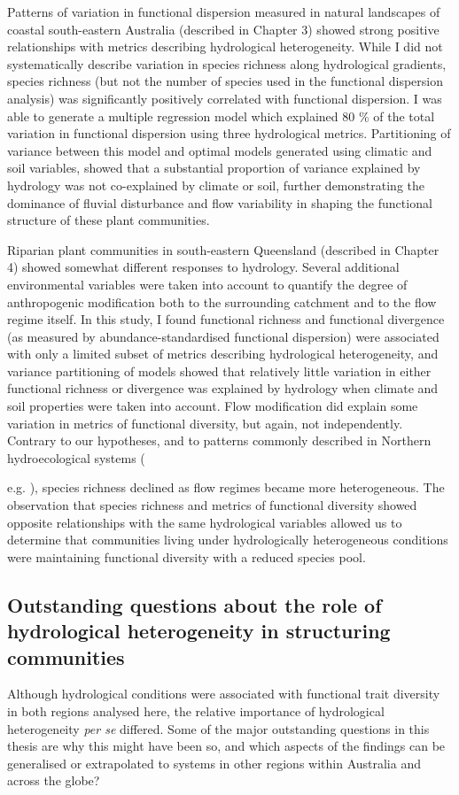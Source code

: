 \documentclass[openright,12pt,a4paper]{memoir}
\begin{document}
{Patterns of variation in functional dispersion measured in natural landscapes of coastal south-eastern Australia (described in Chapter 3) showed strong positive relationships with metrics describing hydrological heterogeneity. While I did not systematically describe variation in species richness along hydrological gradients, species richness (but not the number of species used in the functional dispersion analysis) was significantly positively correlated with functional dispersion. I was able to generate a multiple regression model which explained 80 \% of the total variation in functional dispersion using three hydrological metrics. Partitioning of variance between this model and optimal models generated using climatic and soil variables, showed that a substantial proportion of variance explained by hydrology was not co-explained by climate or soil, further demonstrating the dominance of fluvial disturbance and flow variability in shaping the functional structure of these plant communities.

Riparian plant communities in south-eastern Queensland (described in Chapter 4) showed somewhat different responses to hydrology. Several additional environmental variables were taken into account to quantify the degree of anthropogenic modification both to the surrounding catchment and to the flow regime itself. In this study, I found functional richness and functional divergence (as measured by abundance-standardised functional dispersion) were associated with only a limited subset of metrics describing hydrological heterogeneity, and variance partitioning of models showed that relatively little variation in either functional richness or divergence was explained by hydrology when climate and soil properties were taken into account. Flow modification did explain some variation in metrics of functional diversity, but again, not independently. Contrary to our hypotheses, and to patterns commonly described in Northern hydroecological systems ({e.g. \citet{Naiman1997}), species richness declined as flow regimes became more heterogeneous. The observation that species richness and metrics of functional diversity showed opposite relationships with the same hydrological variables allowed us to determine that communities living under hydrologically heterogeneous conditions were maintaining functional diversity with a reduced species pool. 

\subsection{Outstanding questions about the role of hydrological heterogeneity in structuring communities}
Although hydrological conditions were associated with functional trait diversity in both regions analysed here, the relative importance of hydrological heterogeneity \textit{per se} differed. Some of the major outstanding questions in this thesis are why this might have been so, and which aspects of the findings can be generalised or extrapolated to systems in other regions within Australia and across the globe?

}}
\end{document}
